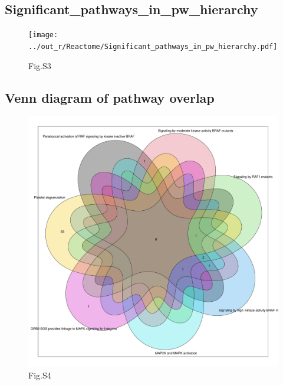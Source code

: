 \documentclass[
]{article}
\begin{document}
\hypertarget{significant_pathways_in_pw_hierarchy}{%
\subsection{Significant\_pathways\_in\_pw\_hierarchy}\label{significant_pathways_in_pw_hierarchy}}

\begin{figure}
\centering
\texttt{[image: ../out\_r/Reactome/Significant\_pathways\_in\_pw\_hierarchy.pdf]}
\caption{Fig.S3}
\end{figure}

\hypertarget{venn-diagram-of-pathway-overlap}{%
\subsection{Venn diagram of pathway
overlap}\label{venn-diagram-of-pathway-overlap}}

\begin{figure}
\centering
\includegraphics{../out_r/14_venn_pw_overlap_3.pdf}
\caption{Fig.S4}
\end{figure}
\end{document}
